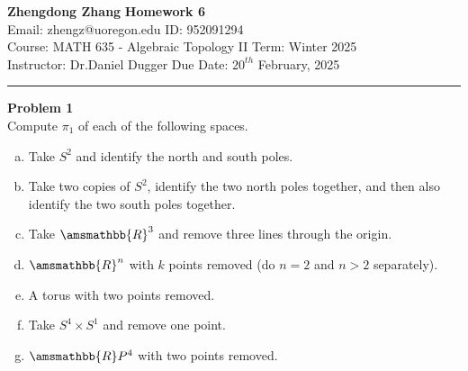 \documentclass[a4paper, 12pt]{article}
\newenvironment{problem}[2][Problem]
    { \begin{mdframed}[backgroundcolor=gray!20] \textbf{#1 #2} \\}
    {  \end{mdframed}}
\renewcommand{\mathbb}{\amsmathbb}
\begin{document}
\noindent
\large\textbf{Zhengdong Zhang} \hfill \textbf{Homework 6}   \\
Email: zhengz@uoregon.edu \hfill ID: 952091294 \\
\normalsize Course: MATH 635 - Algebraic Topology II \hfill Term: Winter 2025\\
Instructor: Dr.Daniel Dugger \hfill Due Date: $20^{th}$ February, 2025 \\
\noindent\rule{7in}{2.8pt}

\begin{problem}{1}
Compute \(\pi_1\) of each of the following spaces. 
\begin{enumerate}[(a)]
\item Take \(S^2\) and identify the north and south poles. 
\item Take two copies of \(S^2\), identify the two north poles together, and then also identify the two south poles together. 
\item Take \(\mathbb{R}^3\) and remove three lines through the origin. 
\item \(\mathbb{R}^n\) with \(k\) points removed (do \(n=2\) and \(n>2\) separately). 
\item A torus with two points removed. 
\item Take \(S^4\times S^1\) and remove one point. 
\item \(\mathbb{R}P^4\) with two points removed.
\end{enumerate}
\end{problem}
\end{document}
